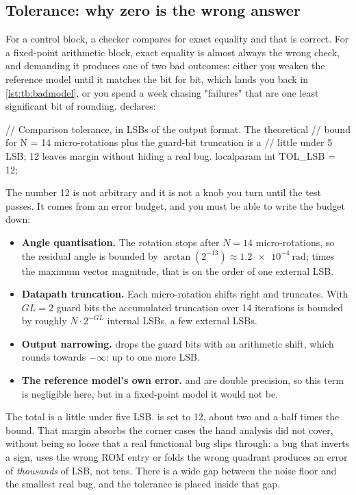 \subsection{Tolerance: why zero is the wrong answer}

For a control block, a checker compares for exact equality and
that is correct. For a fixed-point arithmetic block, exact equality is almost
always the wrong check, and demanding it produces one of two bad outcomes:
either you weaken the reference model until it matches the \RTL{} bit for bit,
which lands you back in \cref{lst:tb:badmodel}, or you spend a week chasing
"failures" that are one least significant bit of rounding.
 declares:

\begin{svcode}
// Comparison tolerance, in LSBs of the output format.  The theoretical
// bound for N = 14 micro-rotations plus the guard-bit truncation is a
// little under 5 LSB; 12 leaves margin without hiding a real bug.
localparam int TOL_LSB = 12;
\end{svcode}

The number 12 is not arbitrary and it is not a knob you turn until the test
passes. It comes from an error budget, and you must be able to write the budget
down:

\begin{itemize}
\item \textbf{Angle quantisation.} The rotation stops after $N=14$
  micro-rotations, so the residual angle is bounded by
  $\arctan(2^{-13}) \approx \SI{1.2e-4}{\radian}$; times the maximum vector
  magnitude, that is on the order of one external LSB.
\item \textbf{Datapath truncation.} Each micro-rotation shifts right and
  truncates. With $GL=2$ guard bits the accumulated truncation over 14
  iterations is bounded by roughly $N \cdot 2^{-GL}$ internal LSBs, a few
  external LSBs.
\item \textbf{Output narrowing.}  drops the guard bits with
  an arithmetic shift, which rounds towards $-\infty$: up to one more LSB.
\item \textbf{The reference model's own error.}  and 
  are double precision, so this term is negligible here, but in a fixed-point
  model it would not be.
\end{itemize}

The total is a little under five LSB.  is set to 12, about two
and a half times the bound. That margin absorbs the corner cases the hand
analysis did not cover, without being so loose that a real functional bug slips
through: a bug that inverts a sign, uses the wrong ROM entry or folds the wrong
quadrant produces an error of \emph{thousands} of LSB, not tens. There is a
wide gap between the noise floor and the smallest real bug, and the tolerance
is placed inside that gap.

